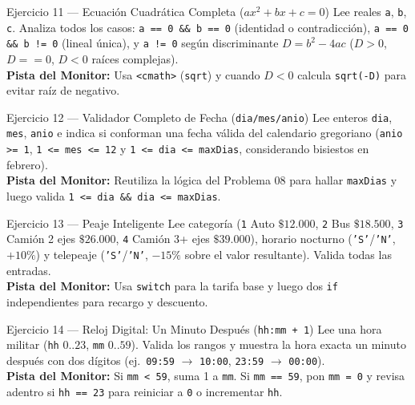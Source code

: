 \documentclass[11pt,letterpaper]{article}
\begin{document}
\begin{ejercicio}{Ejercicio 11 --- Ecuación Cuadrática Completa ($ax^2 + bx + c = 0$)}
Lee reales \texttt{a}, \texttt{b}, \texttt{c}. Analiza todos los casos: \texttt{a == 0 \&\& b == 0} (identidad o contradicción), \texttt{a == 0 \&\& b != 0} (lineal única), y \texttt{a != 0} según discriminante $D = b^2 - 4ac$ ($D > 0$, $D == 0$, $D < 0$ raíces complejas).\\
\textbf{Pista del Monitor:} Usa \texttt{<cmath>} (\texttt{sqrt}) y cuando $D < 0$ calcula \texttt{sqrt(-D)} para evitar raíz de negativo.
\end{ejercicio}

\begin{ejercicio}{Ejercicio 12 --- Validador Completo de Fecha (\texttt{dia/mes/anio})}
Lee enteros \texttt{dia}, \texttt{mes}, \texttt{anio} e indica si conforman una fecha válida del calendario gregoriano (\texttt{anio >= 1}, \texttt{1 <= mes <= 12} y \texttt{1 <= dia <= maxDias}, considerando bisiestos en febrero).\\
\textbf{Pista del Monitor:} Reutiliza la lógica del Problema 08 para hallar \texttt{maxDias} y luego valida \texttt{1 <= dia \&\& dia <= maxDias}.
\end{ejercicio}

\begin{ejercicio}{Ejercicio 13 --- Peaje Inteligente}
Lee categoría (\texttt{1} Auto $\$12.000$, \texttt{2} Bus $\$18.500$, \texttt{3} Camión 2 ejes $\$26.000$, \texttt{4} Camión 3+ ejes $\$39.000$), horario nocturno (\texttt{'S'}/\texttt{'N'}, $+10\%$) y telepeaje (\texttt{'S'}/\texttt{'N'}, $-15\%$ sobre el valor resultante). Valida todas las entradas.\\
\textbf{Pista del Monitor:} Usa \texttt{switch} para la tarifa base y luego dos \texttt{if} independientes para recargo y descuento.
\end{ejercicio}

\begin{ejercicio}{Ejercicio 14 --- Reloj Digital: Un Minuto Después (\texttt{hh:mm + 1})}
Lee una hora militar (\texttt{hh} $0..23$, \texttt{mm} $0..59$). Valida los rangos y muestra la hora exacta un minuto después con dos dígitos (ej.\ \texttt{09:59} $\rightarrow$ \texttt{10:00}, \texttt{23:59} $\rightarrow$ \texttt{00:00}).\\
\textbf{Pista del Monitor:} Si \texttt{mm < 59}, suma 1 a \texttt{mm}. Si \texttt{mm == 59}, pon \texttt{mm = 0} y revisa adentro si \texttt{hh == 23} para reiniciar a \texttt{0} o incrementar \texttt{hh}.
\end{ejercicio}
\end{document}
